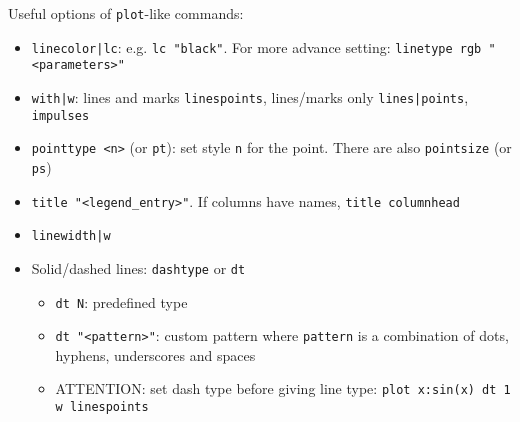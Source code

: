 \documentclass[a4paper,12pt,%
              final%
              ]{article}
\begin{document}
Useful options of \texttt{plot}-like commands:
\begin{itemize}
  \item \verb!linecolor|lc!: e.g. \verb|lc "black"|. For more advance setting: \verb|linetype rgb "<parameters>"|
  \item \verb!with|w!: lines and marks \verb|linespoints|, lines/marks only \verb!lines|points!, \verb|impulses|
  \item \verb|pointtype <n>| (or \verb|pt|): set style \texttt{n} for the point. There are also \verb|pointsize| (or \verb|ps|)
  \item \verb|title "<legend_entry>"|. If columns have names, \verb|title columnhead|
  \item \verb!linewidth|w!
  \item Solid/dashed lines: \verb|dashtype| or \verb|dt|
    \begin{itemize}
      \item \verb|dt N|: predefined type
      \item \verb|dt "<pattern>"|: custom pattern where \verb|pattern| is a combination of dots, hyphens, underscores and spaces
      \item ATTENTION: set dash type before giving line type: \verb|plot x:sin(x) dt 1 w linespoints|
    \end{itemize}
\end{itemize}

\end{document}
